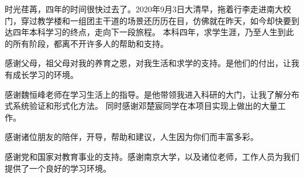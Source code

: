 \documentclass[
    type = bachelor,
    degree = academic,
    twoside,
    fontset = win
]
{njuthesis}
\begin{document}
\begin{acknowledgement}
时光荏苒，四年的时间很快过去了。2020年9月3日大清早，拖着行李走进南大校门，穿过教学楼和一组团主干道的场景还历历在目，仿佛就在昨天，如今却快要到达四年本科学习的终点，走向下一段旅程。
本科四年，求学生涯，乃至人生到此的所有阶段，都离不开许多人的帮助和支持。

感谢父母，祖父母对我的养育之恩，对我生活和求学的支持。是他们的付出，让我有成长学习的环境。

感谢魏恒峰老师在学习生活上的指导。是他带领我进入科研的大门，让我了解分布式系统验证和形式化方法。
同时感谢邓楚宸同学在本项目实现上做出的大量工作。

感谢诸位朋友的陪伴，开导，帮助和建议，人生因为你们而丰富多彩。

感谢党和国家对教育事业的支持。感谢南京大学，以及诸位老师，工作人员为我们提供了一个良好的学习环境。

\end{acknowledgement}
\end{document}
